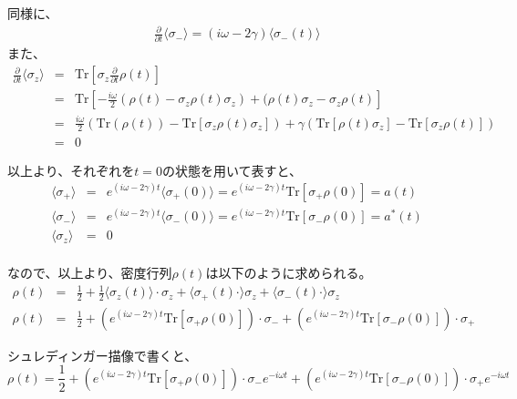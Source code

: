 \documentclass[10pt]{ujarticle}
\begin{document}
同様に、
\begin{eqnarray*}
  \frac{\partial}{\partial t} \langle \sigma_- \rangle = (i\omega -2 \gamma)\langle \sigma_-(t) \rangle
\end{eqnarray*}
また、
\begin{eqnarray*}
  \frac{\partial}{\partial t} \langle \sigma_z \rangle &=& \mathrm{Tr} \left[\sigma_z \frac{\partial}{\partial t}\rho(t)\right]\\
  &=& \mathrm{Tr} \left[ -\frac{i\omega}{2}(\rho(t) - \sigma_z \rho(t) \sigma_z)+(\rho(t)\sigma_z - \sigma_z\rho(t)\right]\\
  &=& \frac{i\omega}{2}(\mathrm{Tr}(\rho(t)) - \mathrm{Tr}[\sigma_z \rho(t) \sigma_z])+ \gamma (\mathrm{Tr}[\rho(t)\sigma_z]-\mathrm{Tr}[\sigma_z \rho(t)])\\
  &=& 0
\end{eqnarray*}

以上より、それぞれを$t=0$の状態を用いて表すと、
\begin{eqnarray*}
  \langle \sigma_+ \rangle &=& e^{(i\omega -2\gamma)t} \langle \sigma_+(0) \rangle = e^{(i\omega -2\gamma)t} \mathrm{Tr} \left[ \sigma_+ \rho(0) \right] = a(t)\\
  \langle \sigma_- \rangle &=& e^{(i\omega -2\gamma)t} \langle \sigma_-(0) \rangle = e^{(i\omega -2\gamma)t} \mathrm{Tr} \left[ \sigma_- \rho(0) \right] = a^*(t)\\
  \langle \sigma_z \rangle &=& 0\\
\end{eqnarray*}

なので、以上より、密度行列$\rho(t)$は以下のように求められる。
\begin{eqnarray*}
  \rho(t) &=& \frac{1}{2} + \frac{1}{2} \langle \sigma_z(t) \rangle \cdot \sigma_z + \langle \sigma_+(t) \cdot \rangle \sigma_z + \langle \sigma_-(t) \cdot \rangle \sigma_z\\
  \rho(t) &=& \frac{1}{2} + \left(e^{(i\omega -2\gamma)t} \mathrm{Tr} \left[ \sigma_+ \rho(0) \right] \right) \cdot \sigma_- + \left(e^{(i\omega -2\gamma)t} \mathrm{Tr} \left[ \sigma_- \rho(0) \right]\right) \cdot \sigma_+
\end{eqnarray*}

シュレディンガー描像で書くと、
\[
\rho(t) = \frac{1}{2} + \left(e^{(i\omega -2\gamma)t} \mathrm{Tr} \left[ \sigma_+ \rho(0) \right] \right) \cdot \sigma_- e^{-i\omega t} + \left(e^{(i\omega -2\gamma)t} \mathrm{Tr} \left[ \sigma_- \rho(0) \right]\right) \cdot \sigma_+ e^{-i\omega t}
\]
\section{}
\end{document}
